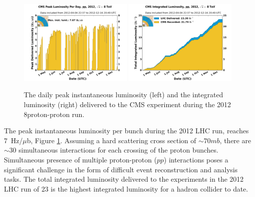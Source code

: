 \begin{figure}[htbp]
\centering
\includegraphics[width=0.49\textwidth]{plots/intro/peak_lumi.pdf}
\includegraphics[width=0.49\textwidth]{plots/intro/int_lumi.pdf}
\caption{The daily peak instantaneous luminosity (left) and the integrated luminosity (right)
 delivered to the CMS experiment during the 2012 8\TeV proton-proton run.\label{fig:lumi}}
\end{figure}

The peak instantaneous luminosity per bunch during the 2012 LHC run, 
 reaches 7~Hz/$\mu$b, Figure \ref{fig:lumi}. 
Assuming a hard scattering cross section of $\sim70mb$, there are $\sim$30 simultaneous interactions 
for each 
crossing of the proton bunches. Simultaneous presence of multiple proton-proton ($pp$) interactions
 poses a significant challenge in the form of difficult event reconstruction and analysis tasks.
 The total integrated luminosity 
delivered to the experiments in the 2012 LHC run of 23 \fbinv 
is the highest integrated luminosity for a hadron collider 
to date.
